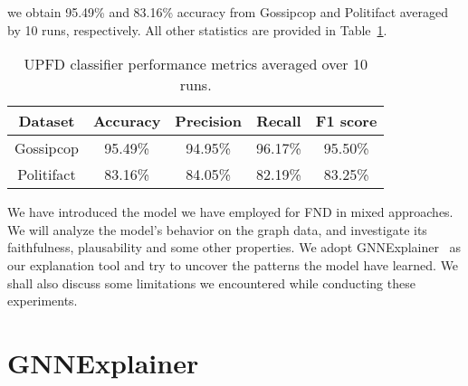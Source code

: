 we obtain 95.49\% and 83.16\% accuracy from Gossipcop and Politifact averaged by 10 runs, respectively. All other statistics are provided in Table~\ref{tab:UPFDClassifier_Results}.
\begin{table}
    \centering
    \begin{tabular}{c | c | c | c | c}
        \textbf{Dataset} & \textbf{Accuracy} & \textbf{Precision} & \textbf{Recall} & \textbf{F1 score} \\
        \hline
        Gossipcop        & 95.49\%           & 94.95\%            & 96.17\%         & 95.50\%           \\
        \hline
        Politifact       & 83.16\%           & 84.05\%            & 82.19\%         & 83.25\%           \\
    \end{tabular}
    \caption[UPFD classifier performance metrics averaged over 10 runs.]{UPFD classifier performance metrics averaged over 10 runs.}
    \label{tab:UPFDClassifier_Results}
\end{table}


We have introduced the model we have employed for FND in mixed approaches. We will analyze the model's behavior on the graph data, and investigate its faithfulness, plausability and some other properties. We adopt GNNExplainer~\parencite{GNNExplainer_Ying} as our explanation tool and try to uncover the patterns the model have learned. We shall also discuss some limitations we encountered while conducting these experiments.

\section{GNNExplainer}
\label{sec:GNNExplainer}


